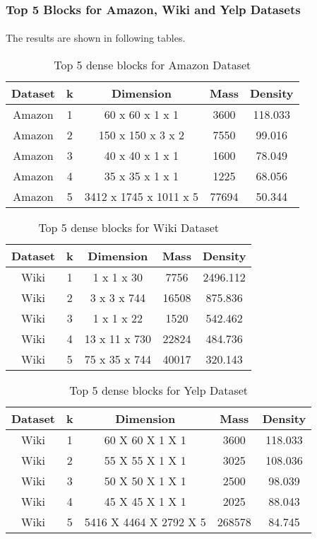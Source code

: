\subsubsection{Top 5 Blocks for Amazon, Wiki and Yelp Datasets}
\paragraph{}
The results are shown in following tables.
\begin{table}[!ht]
\centering
\begin{tabular}{|c|c|c|c|c|}
    \hline
        Dataset & k & Dimension & Mass & Density \\
    \hline
        Amazon & 1 & 60 x 60 x 1 x 1 & 3600 & 118.033 \\
    \hline
        Amazon & 2 & 150 x 150 x 3 x 2 & 7550 & 99.016 \\
    \hline
        Amazon & 3 & 40 x 40 x 1 x 1 & 1600 & 78.049 \\
    \hline
        Amazon & 4 & 35 x 35 x 1 x 1 & 1225 & 68.056 \\
    \hline
        Amazon & 5 & 3412 x 1745 x 1011 x 5 & 77694 & 50.344 \\
    \hline
\end{tabular}
\caption {Top 5 dense blocks for Amazon Dataset}
\end{table}
\begin{table}[!ht]
\centering
\begin{tabular}{|c|c|c|c|c|}
    \hline
        Dataset & k & Dimension & Mass & Density \\
    \hline
        Wiki & 1 & 1 x 1 x 30 & 7756 & 2496.112 \\
    \hline
        Wiki & 2 & 3 x 3 x 744 & 16508 & 875.836 \\
    \hline
        Wiki & 3 & 1 x 1 x 22 & 1520 & 542.462 \\
    \hline
        Wiki & 4 & 13 x 11 x 730 & 22824 & 484.736 \\
    \hline
        Wiki & 5 & 75 x 35 x 744 & 40017 & 320.143 \\
    \hline
\end{tabular}
\caption {Top 5 dense blocks for Wiki Dataset}
\end{table}
\begin{table}[!ht]
\centering
\begin{tabular}{|c|c|c|c|c|}
    \hline
        Dataset & k & Dimension & Mass & Density \\
    \hline
        Wiki & 1 & 60 X 60 X 1 X 1 & 3600 & 118.033 \\
    \hline
        Wiki & 2 & 55 X 55 X 1 X 1 & 3025 & 108.036 \\
    \hline
        Wiki & 3 & 50 X 50 X 1 X 1 & 2500 & 98.039 \\
    \hline
        Wiki & 4 & 45 X 45 X 1 X 1 & 2025 & 88.043 \\
    \hline
        Wiki & 5 & 5416 X 4464 X 2792 X 5 & 268578 & 84.745 \\
    \hline
\end{tabular}
\caption {Top 5 dense blocks for Yelp Dataset}
\end{table}
\newpage
